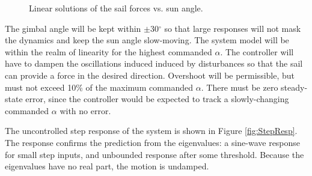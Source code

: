 \documentclass[]{aiaa-tc}%
\begin{document}
	\vspace{5 mm}
	
	\begin{figure}[H]
		\centering
		\caption{Linear solutions of the sail forces vs. sun angle. }
		\label{fig:Force_linearity}
	\end{figure}	

	\vspace{5 mm}

	The gimbal angle will be kept within $\pm$30$^{\circ}$ so that large responses will not mask the dynamics and keep the sun angle slow-moving. The system model will be within the realm of linearity for the highest commanded $\alpha$. The controller will have to dampen the oscillations induced induced by disturbances so that the sail can provide a force in the desired direction. Overshoot will be permissible, but must not exceed 10\% of the maximum commanded $\alpha$. There must be zero steady-state error, since the controller would be expected to track a slowly-changing commanded $\alpha$ with no error. 

	\vspace{5 mm}

	The uncontrolled step response of the system is shown in Figure \ref{fig:StepResp}. The response confirms the prediction from the eigenvalues: a sine-wave response for small step inputs, and unbounded response after some threshold. Because the eigenvalues have no real part, the motion is undamped.

	\vspace{5 mm}
\end{document}
